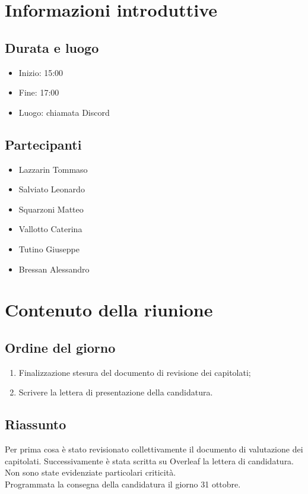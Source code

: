 \documentclass[10pt]{article}
\begin{document}
\newpage
\tableofcontents{\newpage}

\section{Informazioni introduttive}
\subsection{Durata e luogo}
\begin{itemize}
  \item Inizio: 15:00
  \item Fine: 17:00
  \item Luogo: chiamata Discord
\end{itemize}
\subsection{Partecipanti}
\begin{itemize}
  \item Lazzarin Tommaso
  \item Salviato Leonardo
  \item Squarzoni Matteo
  \item Vallotto Caterina
  \item Tutino Giuseppe
  \item Bressan Alessandro
\end{itemize}

\section{Contenuto della riunione}
\subsection{Ordine del giorno}
\begin{enumerate}
  \item Finalizzazione stesura del documento di revisione dei capitolati;
  \item Scrivere la lettera di presentazione della candidatura. 
\end{enumerate}

\subsection{Riassunto}
Per prima cosa è stato revisionato collettivamente il documento di valutazione dei capitolati. Successivamente è stata scritta su Overleaf la lettera di candidatura. Non sono state evidenziate particolari criticità.
\\Programmata la consegna della candidatura il giorno 31 ottobre.
\end{document}
